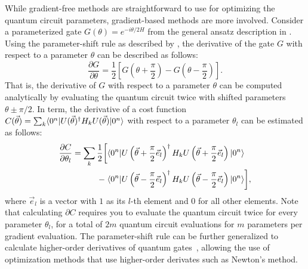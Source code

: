 While gradient-free methods are straightforward to use for optimizing the quantum circuit parameters, gradient-based methods are more involved.
Consider a parameterized gate $G(\theta) = e^{-i\theta/2 H}$ from the general ansatz description in .
Using the parameter-shift rule as described by \textcite{schuld2019evaluating}, the derivative of the gate $G$ with respect to a parameter $\theta$ can be described as follows:
\begin{equation}
\dfrac{\partial G}{\partial \theta} = \dfrac{1}{2}\left[G\left(\theta + \dfrac{\pi}{2}\right) - G\left(\theta - \dfrac{\pi}{2}\right)\right].
\end{equation}
That is, the derivative of $G$ with respect to a parameter $\theta$ can be computed analytically by evaluating the quantum circuit twice with shifted parameters $\theta \pm \pi/2$.
In term, the derivative of a cost function $C(\vec{\theta}) = \sum_k \langle{0^n}\vert U(\vec{\theta})^\dagger H_k U(\vec{\theta})\vert{0^n}\rangle$ with respect to a parameter $\theta_l$ can be estimated as follows:
\begin{equation}
\begin{aligned}
\dfrac{\partial C}{\partial \theta_l} = \sum_k \dfrac{1}{2} \bigg[&\langle{0^n}\vert U\left(\vec{\theta} + \dfrac{\pi}{2}\vec{e}_l\right)^\dagger H_k U\left(\vec{\theta} + \dfrac{\pi}{2}\vec{e}_l\right)\vert{0^n}\rangle \\
- \; &\langle{0^n}\vert U\left(\vec{\theta} - \dfrac{\pi}{2}\vec{e}_l\right)^\dagger H_k U\left(\vec{\theta} - \dfrac{\pi}{2}\vec{e}_l\right)\vert{0^n}\rangle\bigg],
\end{aligned}
\end{equation}
where $\vec{e}_l$ is a vector with $1$ as its $l$-th element and $0$ for all other elements.
Note that calculating $\partial C$ requires you to evaluate the quantum circuit twice for every parameter $\theta_l$, for a total of $2m$ quantum circuit evaluations for $m$ parameters per gradient evaluation.
The parameter-shift rule can be further generalized to calculate higher-order derivatives of quantum gates~\cite{mari2021estimating}, allowing the use of optimization methods that use higher-order derivates such as Newton's method.

